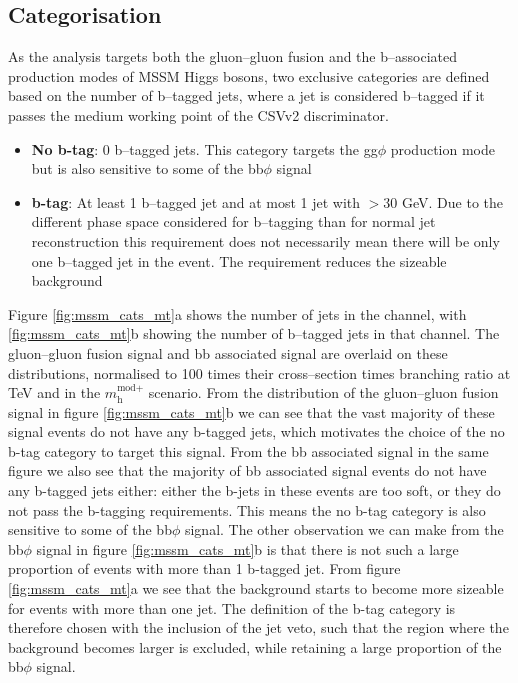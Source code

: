 \subsection{Categorisation}
\label{sec:mssm_eventsel_categories}
As the analysis targets both the gluon--gluon fusion
and the b--associated production modes of MSSM Higgs
bosons, two exclusive categories are defined based on the 
number of b--tagged jets, where a jet is considered b--tagged
if it passes the medium working point of the \ac{CSV}v2 discriminator. 
\begin{itemize}
\setlength{\itemsep}{-\baselineskip}
\item \textbf{No b-tag}: 0 b--tagged jets. This category targets the gg$\phi$ production mode but is also sensitive to some of the bb$\phi$ signal
\item \textbf{b-tag}: At least 1 b--tagged jet and at most 1 
jet with \pT$>30$ GeV. Due to the different phase space considered for
b--tagging than for normal jet reconstruction this requirement does not necessarily
mean there will be only one b--tagged jet in the event. The requirement reduces the sizeable \ttbar
background
\end{itemize}

Figure \ref{fig:mssm_cats_mt}a shows the number of jets 
in the \mutau channel, with \ref{fig:mssm_cats_mt}b showing
the number of b--tagged jets in that channel. The gluon--gluon fusion
signal and bb associated signal are overlaid on these distributions, normalised
to 100 times their cross--section times branching ratio at  TeV and 
 in the $m_{\text{h}}^{\text{mod+}}$ scenario. From the distribution of the
gluon--gluon fusion signal in figure \ref{fig:mssm_cats_mt}b we can 
see that the vast majority of these signal events do not have any b-tagged jets, which
motivates the choice of the no b-tag category to target this signal. From
the bb associated signal in the same figure we also see that the majority of bb associated
signal events do not have any b-tagged jets either: either the b-jets in these events 
are too soft, or they do not pass the b-tagging requirements. This means the no b-tag 
category is also sensitive to some of the bb$\phi$ signal. The other observation we 
can make from the bb$\phi$ signal in figure \ref{fig:mssm_cats_mt}b is that there is not
such a large proportion of events with more than 1 b-tagged jet. From figure \ref{fig:mssm_cats_mt}a
we see that the \ttbar background starts to become more sizeable for events with more than
one jet. The definition of the b-tag category is therefore chosen with the inclusion
of the jet veto, such that the region where the \ttbar background becomes larger is excluded, 
while retaining a large proportion of the bb$\phi$ signal.

